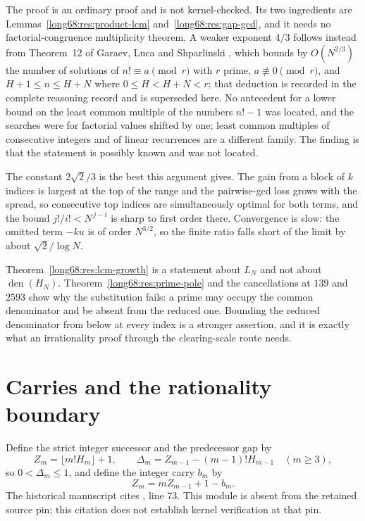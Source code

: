 \documentclass[11pt]{article}
\newcommand{\Lc}{L}
\newcommand{\den}{\operatorname{den}}
\begin{document}
The proof is an ordinary proof and is not kernel-checked.  Its two
ingredients are Lemmas~\ref{long68:res:product-lcm} and~\ref{long68:res:gap-gcd}, and it
needs no factorial-congruence multiplicity theorem.  A weaker exponent
$4/3$ follows instead from Theorem~12 of Garaev, Luca and Shparlinski
\cite[arXiv v1, Thm.~12, p.~16]{garaev-luca-shparlinski}, which bounds by
$O(N^{2/3})$ the number of solutions of $n!\equiv a\pmod r$ with
$r$ prime, $a\not\equiv0\pmod r$, and $H+1\le n\le H+N$ where
$0\le H<H+N<r$; that deduction is recorded in the complete reasoning record and
is superseded here.  No antecedent for a lower bound on the least common
multiple of the numbers $n!-1$ was located, and the searches were for
factorial values shifted by one; least common multiples of consecutive
integers and of linear recurrences are a different family.  The finding is
that the statement is possibly known and was not located.

The constant $2\sqrt2/3$ is the best this argument gives.  The gain from a
block of $k$ indices is largest at the top of the range and the pairwise-gcd
loss grows with the spread, so consecutive top indices are simultaneously
optimal for both terms, and the bound $j!/i!<N^{\,j-i}$ is sharp to first
order there.  Convergence is slow: the omitted term $-ku$ is of order
$N^{3/2}$, so the finite ratio falls short of the limit by about
$\sqrt2/\log N$.

Theorem~\ref{long68:res:lcm-growth} is a statement about $\Lc_N$ and not about
$\den(H_N)$.  Theorem~\ref{long68:res:prime-pole} and the cancellations at $139$ and
$2593$ show why the substitution fails: a prime may occupy the common
denominator and be absent from the reduced one.  Bounding the reduced
denominator from below at every index is a stronger assertion, and it is
exactly what an irrationality proof through the clearing-scale route needs.

\section{Carries and the rationality boundary}\label{long68:sec:carry}

Define the strict integer successor and the predecessor gap by
\[
 Z_m=\lfloor m!H_m\rfloor+1,\qquad
 \Delta_m=Z_{m-1}-(m-1)!H_{m-1}\quad(m\ge3),
\]
so $0<\Delta_m\le1$, and define the integer carry $b_m$ by
\begin{equation}\label{long68:eq:carry-recurrence}
 Z_m=mZ_{m-1}+1-b_m .
\end{equation}
  The historical manuscript cites , line 73. This module is absent from the retained source pin; this citation does not establish kernel verification at that pin.
\end{document}
